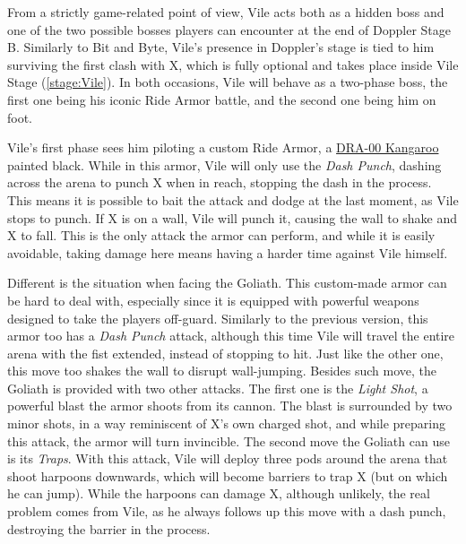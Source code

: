 From a strictly game-related point of view, Vile acts both as a hidden boss and one of the two possible bosses players can encounter at the end of Doppler Stage B. Similarly to Bit and Byte, Vile's presence in Doppler's stage is tied to him surviving the first clash with X, which is fully optional and takes place inside Vile Stage (\ref{stage:Vile}). In both occasions, Vile will behave as a two-phase boss, the first one being his iconic Ride Armor battle, and the second one being him on foot.

Vile's first phase sees him piloting a custom Ride Armor, a \hyperlink{vehicle:Ride_Armor_Kangaroo}{DRA-00 Kangaroo} painted black. While in this armor, Vile will only use the \emph{Dash Punch}, dashing across the arena to punch X when in reach, stopping the dash in the process. This means it is possible to bait the attack and dodge at the last moment, as Vile stops to punch. If X is on a wall, Vile will punch it, causing the wall to shake and X to fall. This is the only attack the armor can perform, and while it is easily avoidable, taking damage here means having a harder time against Vile himself.

Different is the situation when facing the Goliath. This custom-made armor can be hard to deal with, especially since it is equipped with powerful weapons designed to take the players off-guard. Similarly to the previous version, this armor too has a \emph{Dash Punch} attack, although this time Vile will travel the entire arena with the fist extended, instead of stopping to hit. Just like the other one, this move too shakes the wall to disrupt wall-jumping. Besides such move, the Goliath is provided with two other attacks. The first one is the \emph{Light Shot}, a powerful blast the armor shoots from its cannon. The blast is surrounded by two minor shots, in a way reminiscent of X's own charged shot, and while preparing this attack, the armor will turn invincible. The second move the Goliath can use is its \emph{Traps}. With this attack, Vile will deploy three pods around the arena that shoot harpoons downwards, which will become barriers to trap X (but on which he can jump). While the harpoons can damage X, although unlikely, the real problem comes from Vile, as he always follows up this move with a dash punch, destroying the barrier in the process.

